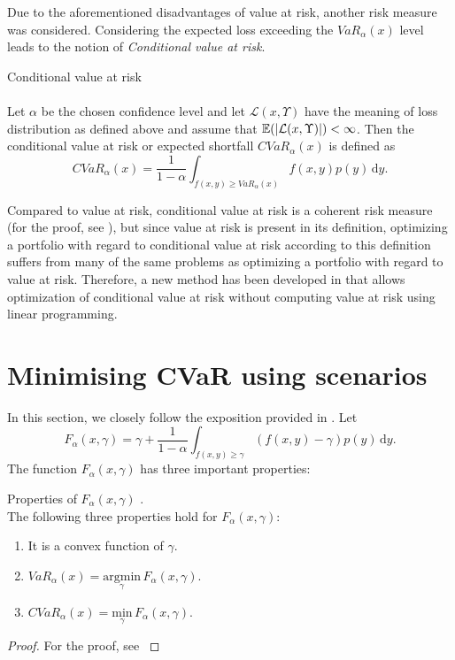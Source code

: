 Due to the aforementioned disadvantages of value at risk, another risk measure was considered.
Considering the expected loss exceeding the $VaR_{\alpha}(x)$ level leads to the notion of \textit{Conditional value at risk}. 

\begin{defn}{Conditional value at risk} 
\label{cvar_definition}
\\  
\cite[p. 275]{cornuejols_tutuncu_2006}
\\
Let $\alpha$ be the chosen confidence level and let $\mathcal{L}(x,\Upsilon)$ have the meaning of loss distribution as defined above and assume that $\mathbb{E}(\left|{\mathcal{L}(x,\Upsilon)}\right|)<\infty$. Then the conditional value at risk or expected shortfall $CVaR_{\alpha}(x)$ is defined as
\begin{equation}
CVaR_{\alpha}(x)=\frac{1}{1-\alpha}\int_{f(x,y) \geq VaR_{\alpha}(x)} f(x,y)p(y) \, \mathrm{d} y.
\end{equation}
\end{defn}
Compared to value at risk, conditional value at risk is a coherent risk measure (for the proof, see \cite[Example 2.26.]{mcneil2015quantitative}), but since value at risk is present in its definition, optimizing a portfolio with regard to conditional value at risk according to this definition suffers from many of the same problems as optimizing a portfolio with regard to value at risk. Therefore, a new method has been developed in \cite{Rockafellar2000OptimizationOC} that allows optimization of conditional value at risk without computing value at risk using linear programming.

\section{Minimising CVaR using scenarios}
In this section, we closely follow the exposition provided in \cite[p. 275-278]{cornuejols_tutuncu_2006}.
Let
\begin{equation}
\label{eq:cvar_approx}
F_{\alpha}(x,\gamma)=\gamma + \frac{1}{1-\alpha} \int_{f(x,y) \geq \gamma} (f(x,y)-\gamma)p(y) \, \mathrm{d}y.
\end{equation}
The function $F_{\alpha}(x,\gamma)$ has three important properties:
\begin{lemma}{Properties of $F_{\alpha}(x,\gamma)$ \cite[p. 276]{cornuejols_tutuncu_2006}.}
\label{lemma:properties_of_cvar_approx} 
\\
The following three properties hold for $F_{\alpha}(x,\gamma)$:
\begin{enumerate}
	\item It is a convex function of $\gamma$.
	\item $VaR_{\alpha}(x)=\underset{\gamma}{\mathrm{argmin}} \, F_{\alpha}(x,\gamma)$.
	\item $ CVaR_{\alpha}(x) = \underset{\gamma}{\mathrm{min}} \, F_{\alpha}(x,\gamma)$.
\end{enumerate}
\end{lemma}
\begin{proof}
For the proof, see \cite[Theorems 1 and 2]{Rockafellar2000OptimizationOC}
\end{proof}
